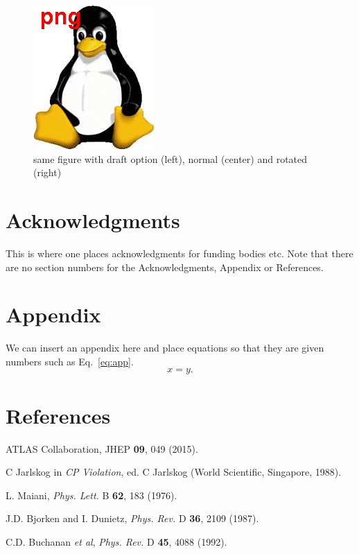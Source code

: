 \documentclass{blois}
\def\Journal#1#2#3#4{{#1} {\bf #2}, #3 (#4)}
\def\PLB{{\em Phys. Lett.}  B}
\def\PRD{{\em Phys. Rev.} D}
\def\be{\begin{equation}}
\def\ee{\end{equation}}
\begin{document}
\begin{figure}
\begin{minipage}{0.32\linewidth}
\centerline{\includegraphics[angle=-45,width=0.7\linewidth]{figexamp}}
\end{minipage}
\caption[]{same figure with draft option (left), normal (center) and rotated (right)}
\label{fig:radish}
\end{figure}

\section*{Acknowledgments}

This is where one places acknowledgments for funding bodies etc.
Note that there are no section numbers for the Acknowledgments, Appendix
or References.

\section*{Appendix}

 We can insert an appendix here and place equations so that they are
given numbers such as Eq.~\ref{eq:app}.
\be
x = y.
\label{eq:app}
\ee

\section*{References}

\begin{thebibliography}{99}

ATLAS Collaboration, \Journal{JHEP}{09}{049}{2015}.

C Jarlskog in {\em CP Violation}, ed. C Jarlskog
(World Scientific, Singapore, 1988).

L. Maiani, \Journal{\PLB}{62}{183}{1976}.

J.D. Bjorken and I. Dunietz, \Journal{\PRD}{36}{2109}{1987}.

C.D. Buchanan {\it et al}, \Journal{\PRD}{45}{4088}{1992}.

\end{thebibliography}
\end{document}
